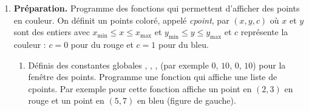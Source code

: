 \documentclass[11pt,class=report,crop=false]{standalone}
\begin{document}

\begin{activite}
	


\begin{enumerate}
	\item \textbf{Préparation.}
	Programme des fonctions qui permettent d'afficher des points en couleur.
	On définit un points coloré, appelé \emph{cpoint}, par $(x,y,c)$
	où $x$ et $y$ sont des entiers avec $x_{\min} \le x \le x_{\max}$ et $y_{\min} \le y \le y_{\max}$
	et $c$ représente la couleur : $c=0$ pour du rouge et $c=1$ pour du bleu.
	
	
	\begin{enumerate}
		\item Définis des constantes globales , , ,  (par exemple $0$, $10$, $0$, $10$) pour la fenêtre des points.
		Programme une fonction  qui affiche une liste de cpoints.
		Par exemple pour  cette fonction affiche un point en $(2,3)$ en rouge et un point en $(5,7)$ en bleu (figure de gauche).
		

\end{enumerate}
\end{enumerate}
\end{activite}
\end{document}
